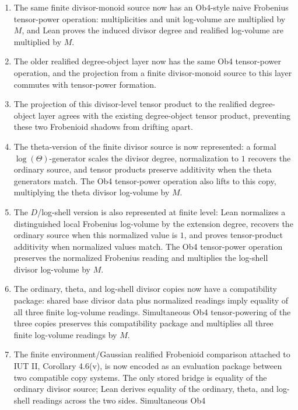 \documentclass[11pt]{article}
\newcommand{\IUT}{IUT}
\newcommand{\Lean}{Lean}
\theoremstyle{plain}
\theoremstyle{definition}
\theoremstyle{remark}
\begin{document}
\begin{enumerate}
  multiplicities and unit log-volumes add, and \Lean{} proves additivity of the
  induced divisor degree and realified log-volume.
\item The same finite divisor-monoid source now has an Ob4-style naive
  Frobenius tensor-power operation: multiplicities and unit log-volume are
  multiplied by \(M\), and \Lean{} proves the induced divisor degree and
  realified log-volume are multiplied by \(M\).
\item The older realified degree-object layer now has the same Ob4 tensor-power
  operation, and the projection from a finite divisor-monoid source to this
  layer commutes with tensor-power formation.
\item The projection of this divisor-level tensor product to the realified
  degree-object layer agrees with the existing degree-object tensor product,
  preventing these two Frobenioid shadows from drifting apart.
\item The theta-version of the finite divisor source is now represented: a
  formal \(\log(\Theta)\)-generator scales the divisor degree, normalization to
  \(1\) recovers the ordinary source, and tensor products preserve additivity
  when the theta generators match.  The Ob4 tensor-power operation also lifts
  to this copy, multiplying the theta divisor log-volume by \(M\).
\item The \(D\)/log-shell version is also represented at finite level:
  \Lean{} normalizes a distinguished local Frobenius log-volume by the
  extension degree, recovers the ordinary source when this normalized value is
  \(1\), and proves tensor-product additivity when normalized values match.
  The Ob4 tensor-power operation preserves the normalized Frobenius reading and
  multiplies the log-shell divisor log-volume by \(M\).
\item The ordinary, theta, and log-shell divisor copies now have a compatibility
  package: shared base divisor data plus normalized readings imply equality of
  all three finite log-volume readings.  Simultaneous Ob4 tensor-powering of
  the three copies preserves this compatibility package and multiplies all
  three finite log-volume readings by \(M\).
\item The finite environment/Gaussian realified Frobenioid comparison attached
  to \IUT{} II, Corollary 4.6(v), is now encoded as an evaluation package
  between two compatible copy systems.  The only stored bridge is equality of
  the ordinary divisor source; \Lean{} derives equality of the ordinary,
  theta, and log-shell readings across the two sides.  Simultaneous Ob4

\end{enumerate}
\end{document}
